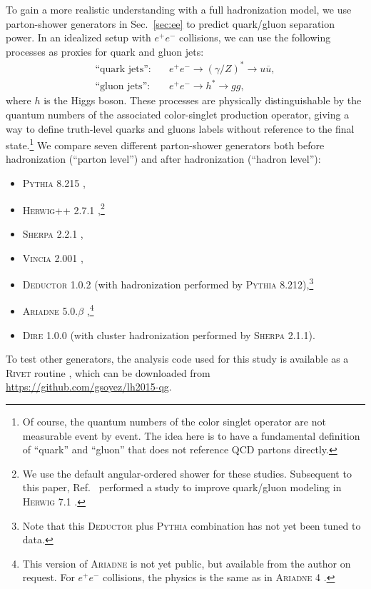 \documentclass[11pt,letterpaper]{article}
\DeclareRobustCommand{\Sec}[1]{Sec.~\ref{#1}}
\DeclareRobustCommand{\Ref}[1]{Ref.~\cite{#1}}
\begin{document}
To gain a more realistic understanding with a full hadronization model, we use parton-shower generators in \Sec{sec:ee} to predict quark/gluon separation power.  In an idealized setup with $e^+e^-$ collisions, we can use the following processes as proxies for quark and gluon jets:
\begin{align}
\text{``quark jets''}: \quad & e^+e^- \to (\gamma/Z)^* \to u \overline{u}, \\
\text{``gluon jets''}: \quad & e^+e^- \to h^* \to g g,
\end{align}
where $h$ is the Higgs boson.  These processes are physically
distinguishable by the quantum numbers of the associated color-singlet
production operator, giving a way to define truth-level quarks and
gluons labels without reference to the final state.\footnote{Of course, the quantum numbers of the color singlet operator are not measurable event by event.  The idea here is to have a fundamental definition of ``quark'' and ``gluon'' that does not reference QCD partons directly.}  We
compare seven different parton-shower generators both before
hadronization (``parton level'') and after hadronization (``hadron
level''):
\begin{itemize}
\item \textsc{Pythia 8.215} \cite{Sjostrand:2014zea},
\item \textsc{Herwig++ 2.7.1} \cite{Bahr:2008pv,Bellm:2013hwb},\footnote{We use the default angular-ordered shower for these studies.  Subsequent to this paper, \Ref{Reichelt:2017hts} performed a study to improve quark/gluon modeling in \textsc{Herwig 7.1} \cite{Bellm:2015jjp,Bellm:2017bvx}.}
\item \textsc{Sherpa 2.2.1} \cite{Gleisberg:2008ta},
\item \textsc{Vincia 2.001} \cite{Fischer:2016vfv},
\item \textsc{Deductor 1.0.2} \cite{Nagy:2014mqa} (with hadronization performed by \textsc{Pythia 8.212}),\footnote{Note that this
\textsc{Deductor} plus \textsc{Pythia} combination has not yet been tuned to data.}
\item \textsc{Ariadne 5.0.$\beta$} \cite{Flensburg:2011kk},\footnote{This version of \textsc{Ariadne} is not yet public, but available from the author on request.  For $e^+ e^-$ collisions, the physics is the same as in \textsc{Ariadne 4} \cite{Lonnblad:1992tz}.}
\item \textsc{Dire 1.0.0} \cite{Hoche:2015sya} (with cluster hadronization performed by \textsc{Sherpa 2.1.1}).
\end{itemize}
To test other generators, the analysis code used for this study is available as a \textsc{Rivet} routine \cite{Buckley:2010ar}, which can be downloaded from \url{https://github.com/gsoyez/lh2015-qg}.
\end{document}
